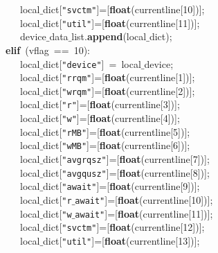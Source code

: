 \mbox{}\ \ \ \ \ \ \ \ \ \ \ \ \ \ \ \ \ \ local$\_$dict[\texttt{"{}svctm"{}}]=[\textbf{float}(currentline[10])]; \\
\mbox{}\ \ \ \ \ \ \ \ \ \ \ \ \ \ \ \ \ \ local$\_$dict[\texttt{"{}util"{}}]=[\textbf{float}(currentline[11])]; \\
\mbox{}\ \ \ \ \ \ \ \ \ \ \ \ \ \ \ \ \ \ device$\_$data$\_$list.\textbf{append}(local$\_$dict); \\
\mbox{}\ \ \ \ \ \ \ \ \ \ \ \ \ \ \ \textbf{elif}\ (vflag\ ==\ 10): \\
\mbox{}\ \ \ \ \ \ \ \ \ \ \ \ \ \ \ \ \ \ local$\_$dict[\texttt{"{}device"{}}]\ =\ local$\_$device; \\
\mbox{}\ \ \ \ \ \ \ \ \ \ \ \ \ \ \ \ \ \ local$\_$dict[\texttt{"{}rrqm"{}}]=[\textbf{float}(currentline[1])]; \\
\mbox{}\ \ \ \ \ \ \ \ \ \ \ \ \ \ \ \ \ \ local$\_$dict[\texttt{"{}wrqm"{}}]=[\textbf{float}(currentline[2])]; \\
\mbox{}\ \ \ \ \ \ \ \ \ \ \ \ \ \ \ \ \ \ local$\_$dict[\texttt{"{}r"{}}]=[\textbf{float}(currentline[3])];\  \\
\mbox{}\ \ \ \ \ \ \ \ \ \ \ \ \ \ \ \ \ \ local$\_$dict[\texttt{"{}w"{}}]=[\textbf{float}(currentline[4])]; \\
\mbox{}\ \ \ \ \ \ \ \ \ \ \ \ \ \ \ \ \ \ local$\_$dict[\texttt{"{}rMB"{}}]=[\textbf{float}(currentline[5])]; \\
\mbox{}\ \ \ \ \ \ \ \ \ \ \ \ \ \ \ \ \ \ local$\_$dict[\texttt{"{}wMB"{}}]=[\textbf{float}(currentline[6])]; \\
\mbox{}\ \ \ \ \ \ \ \ \ \ \ \ \ \ \ \ \ \ local$\_$dict[\texttt{"{}avgrqsz"{}}]=[\textbf{float}(currentline[7])]; \\
\mbox{}\ \ \ \ \ \ \ \ \ \ \ \ \ \ \ \ \ \ local$\_$dict[\texttt{"{}avgqusz"{}}]=[\textbf{float}(currentline[8])]; \\
\mbox{}\ \ \ \ \ \ \ \ \ \ \ \ \ \ \ \ \ \ local$\_$dict[\texttt{"{}await"{}}]=[\textbf{float}(currentline[9])]; \\
\mbox{}\ \ \ \ \ \ \ \ \ \ \ \ \ \ \ \ \ \ local$\_$dict[\texttt{"{}r$\_$await"{}}]=[\textbf{float}(currentline[10])]; \\
\mbox{}\ \ \ \ \ \ \ \ \ \ \ \ \ \ \ \ \ \ local$\_$dict[\texttt{"{}w$\_$await"{}}]=[\textbf{float}(currentline[11])]; \\
\mbox{}\ \ \ \ \ \ \ \ \ \ \ \ \ \ \ \ \ \ local$\_$dict[\texttt{"{}svctm"{}}]=[\textbf{float}(currentline[12])]; \\
\mbox{}\ \ \ \ \ \ \ \ \ \ \ \ \ \ \ \ \ \ local$\_$dict[\texttt{"{}util"{}}]=[\textbf{float}(currentline[13])]; \\
